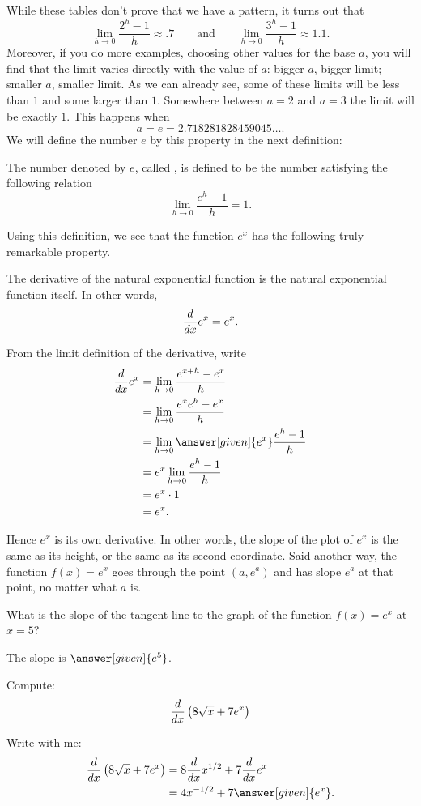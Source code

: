\documentclass{ximera}
\begin{document}
While these tables don't prove that we have a pattern, it turns out that
\[ \lim_{h\to 0}\frac{2^h-1}{h} \approx .7 \qquad\text{and}\qquad \lim_{h\to 0} \frac{3^h-1}{h} \approx 1.1. \]
Moreover, if you do more examples, choosing other values for the 
base $a$, you will find that the limit varies
directly with the value of $a$: bigger $a$, bigger limit; smaller $a$,
smaller limit. As we can already see, some of these limits will be
less than $1$ and some larger than $1$. Somewhere between $a=2$ and $a=3$
the limit will be exactly $1$. This happens when 
\[ a = e = 2.718281828459045\dots. \]
We will define the number $e$ by this property in the next definition:
\begin{definition}
	The number denoted by $e$, called , is defined
  	to be the number satisfying the following relation
  	\[ \lim_{h\to 0} \frac{e^h-1}{h} = 1.\]
\end{definition}

Using this definition, we see that the function $e^x$ has the following truly remarkable property.

\begin{theorem}
	The derivative of the natural exponential function is the natural exponential function itself.  In other words,
	\[ \frac{d}{\mathop{}\!d x} e^x = e^x. \]
	\begin{explanation}  
		From the limit definition of the derivative, write
		\begin{align*}
			\ddx e^x&=\lim_{h\to 0} \frac{e^{x+h}-e^x}{h} \\
				&=\lim_{h\to 0} \frac{e^xe^{h}-e^x}{h} \\
				&=\lim_{h\to 0} \answer[given]{e^x}\frac{e^{h}-1}{h} \\
				&=e^x\lim_{h\to 0} \frac{e^{h}-1}{h} \\
				&=e^x\cdot1\\
				&=e^x.
		\end{align*}
	\end{explanation}
\end{theorem}


Hence $e^x$ is its own derivative. In other words, the slope of the
plot of $e^x$ is the same as its height, or the same as its second
coordinate.  Said another way, the function $f(x)=e^x$ goes through the point $(a,e^a)$
and has slope $e^a$ at that point, no matter what $a$ is. 

\begin{question}
  What is the slope of the tangent line to the graph of the function $f(x) = e^x$ at $x = 5$?
  \begin{prompt}
    The slope is $\answer[given]{e^5}$.
  \end{prompt}
\end{question}



\begin{example}
	Compute:
	\[ \frac{d}{\mathop{}\!d x}\left(8\sqrt{x} + 7e^x \right) \]
	\begin{explanation}
		Write with me:
		\begin{align*}
			\ddx\left(8\sqrt{x} + 7e^x \right) &= 8\ddx x^{1/2} + 7\ddx e^x\\
				&= 4x^{-1/2} + 7 \answer[given]{e^x}.
		\end{align*}
	\end{explanation}
\end{example}
\end{document}
